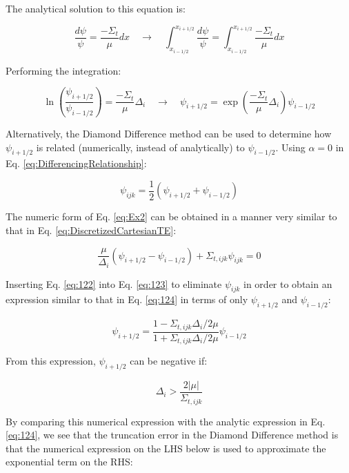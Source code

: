 \documentclass[10pt]{article}
\begin{document}
\begin{flushleft}
\begin{tcolorbox}[breakable]
The analytical solution to this equation is:

\begin{equation}
\frac{d\psi}{\psi}=\frac{-\Sigma_t}{\mu}dx\quad\rightarrow\quad\int_{x_{i-1/2}}^{x_{i+1/2}}\frac{d\psi}{\psi}=\int_{x_{i-1/2}}^{x_{i+1/2}}\frac{-\Sigma_t}{\mu}dx
\end{equation}

Performing the integration:

\begin{equation}
\label{eq:124}
\ln{\left(\frac{\psi_{i+1/2}}{\psi_{i-1/2}}\right)}=\frac{-\Sigma_t}{\mu}\Delta_i\quad\rightarrow\quad\psi_{i+1/2}=\exp{\left(\frac{-\Sigma_t}{\mu}\Delta_i\right)}\psi_{i-1/2}
\end{equation}

Alternatively, the Diamond Difference method can be used to determine how \(\psi_{i+1/2}\) is related (numerically, instead of analytically) to \(\psi_{i-1/2}\). Using \(\alpha=0\) in Eq. \eqref{eq:DifferencingRelationship}:

\begin{equation}
\label{eq:122}
\psi_{ijk}=\frac{1}{2}\left(\psi_{i+1/2}+\psi_{i-1/2}\right)
\end{equation}

The numeric form of Eq. \eqref{eq:Ex2} can be obtained in a manner very similar to that in Eq. \eqref{eq:DiscretizedCartesianTE}:

\begin{equation}
\label{eq:123}
\frac{\mu}{\Delta_i}(\psi_{i+1/2}-\psi_{i-1/2})+\Sigma_{t,ijk}\psi_{ijk}=0
\end{equation}

Inserting Eq. \eqref{eq:122} into Eq. \eqref{eq:123} to eliminate \(\psi_{ijk}\) in order to obtain an expression similar to that in Eq. \eqref{eq:124} in terms of only \(\psi_{i+1/2}\) and \(\psi_{i-1/2}\):

\begin{equation}
\psi_{i+1/2}=\frac{1-\Sigma_{t,ijk}\Delta_i/2\mu}{1+\Sigma_{t,ijk}\Delta_i/2\mu}\psi_{i-1/2}
\end{equation}

From this expression, \(\psi_{i+1/2}\) can be negative if:

\begin{equation}
\Delta_i>\frac{2|\mu|}{\Sigma_{t,ijk}}
\end{equation}

By comparing this numerical expression with the analytic expression in Eq. \eqref{eq:124}, we see that the truncation error in the Diamond Difference method is that the numerical expression on the LHS below is used to approximate the exponential term on the RHS:


\end{tcolorbox}
\end{flushleft}
\end{document}
